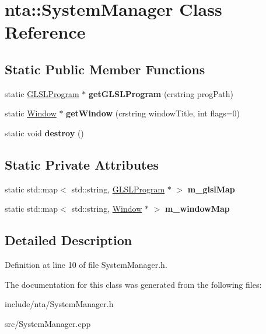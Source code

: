 \hypertarget{classnta_1_1SystemManager}{}\section{nta\+:\+:System\+Manager Class Reference}
\label{classnta_1_1SystemManager}
\subsection*{Static Public Member Functions}
\begin{DoxyCompactItemize}
\item 
\mbox{\label{classnta_1_1SystemManager_af37be3ff4538da0a95b5ca257187077c}} 
static \hyperlink{classnta_1_1GLSLProgram}{G\+L\+S\+L\+Program} $\ast$ {\bfseries get\+G\+L\+S\+L\+Program} (crstring prog\+Path)
\item 
\mbox{\label{classnta_1_1SystemManager_af3577fda5a1a1019f51fbc352047dc1f}} 
static \hyperlink{classnta_1_1Window}{Window} $\ast$ {\bfseries get\+Window} (crstring window\+Title, int flags=0)
\item 
\mbox{\label{classnta_1_1SystemManager_a69721eaa78fda16f0f028d2991672282}} 
static void {\bfseries destroy} ()
\end{DoxyCompactItemize}
\subsection*{Static Private Attributes}
\begin{DoxyCompactItemize}
\item 
\mbox{\label{classnta_1_1SystemManager_a22703ea675725af427acc8a19853fb4d}} 
static std\+::map$<$ std\+::string, \hyperlink{classnta_1_1GLSLProgram}{G\+L\+S\+L\+Program} $\ast$ $>$ {\bfseries m\+\_\+glsl\+Map}
\item 
\mbox{\label{classnta_1_1SystemManager_ad19f3250449b0ddad40bf42601d36b1a}} 
static std\+::map$<$ std\+::string, \hyperlink{classnta_1_1Window}{Window} $\ast$ $>$ {\bfseries m\+\_\+window\+Map}
\end{DoxyCompactItemize}


\subsection{Detailed Description}


Definition at line 10 of file System\+Manager.\+h.



The documentation for this class was generated from the following files\+:\begin{DoxyCompactItemize}
\item 
include/nta/System\+Manager.\+h\item 
src/System\+Manager.\+cpp\end{DoxyCompactItemize}
